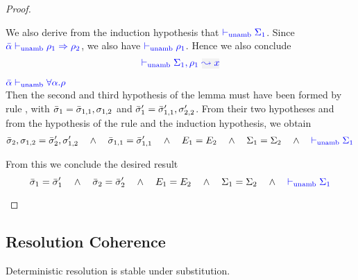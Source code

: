 \begin{proof}
\begin{description}
  We also derive from the induction hypothesis that ${\color{blue}  \vdash_{\mathrm{unamb}} \Sigma_1}$. 
  Since ${\color{blue} \bar{\alpha} \vdash_{\mathrm{unamb}} \rho_1 \Rightarrow \rho_2}$, we also have ${\color{blue}  \vdash_{\mathrm{unamb}} \rho_1}$.
  Hence we also conclude
\begin{equation*}
  \unambig{}{\Sigma_1,\ie{\rulet_1}{x}}
\end{equation*}
\item[\fbox{\rref{UA-TAbs}}]\quad${\color{blue} \bar{\alpha} \vdash_{\mathrm{unamb}} \forall \alpha.\rho}$\\

Then the second and third hypothesis of the lemma must have been formed by rule ,
  with $\bar{\sigma}_1 = \bar{\sigma}_{1,1},\sigma_{1,2}$ and $\bar{\sigma}_1' = \bar{\sigma}_{1,1}',\sigma_{2,2}'$.
  From their two hypotheses and from the hypothesis of the rule and the induction hypothesis, we obtain
\begin{equation*}
  \bar{\sigma}_2,\sigma_{1,2} = \bar{\sigma}_2',\sigma_{1,2}' 
  \quad\wedge\quad
  \bar{\sigma}_{1,1} = \bar{\sigma}_{1,1}'
  \quad\wedge\quad
  E_1 = E_2
  \quad\wedge\quad
  \Sigma_1 = \Sigma_2
  \quad\wedge\quad
  {\color{blue}  \vdash_{\mathrm{unamb}}\Sigma_1}
\end{equation*}
  
  From this we conclude the desired result 
\begin{equation*}
  \bar{\sigma}_1 = \bar{\sigma}_1' \quad\wedge\quad \bar{\sigma}_2 = \bar{\sigma}_2'
  \quad\wedge\quad
  E_1 = E_2
  \quad\wedge\quad
  \Sigma_1 = \Sigma_2
  \quad\wedge\quad
  {\color{blue}  \vdash_{\mathrm{unamb}}\Sigma_1}
\end{equation*}
\end{description}
\end{proof}

\subsection{Resolution Coherence}\label{proof:coherence}

Deterministic resolution is stable under substitution.

